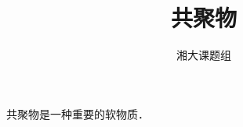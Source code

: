 \documentclass[12pt,a4paper]{article}
\title{共聚物}
\author{湘大课题组}
\date{\chntoday}
\begin{document}
\maketitle

共聚物是一种重要的软物质．




\cite{tam19912d}

\end{document}
